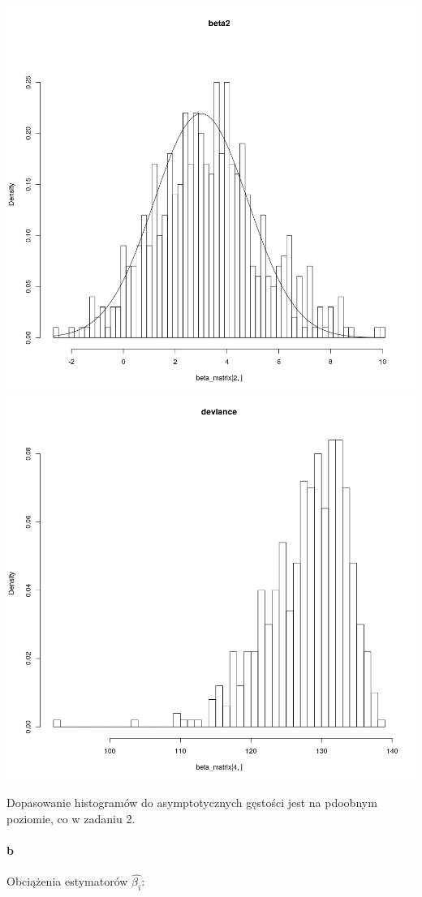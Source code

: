 \documentclass[a4paper,11pt]{article}
\begin{document}
\includegraphics[scale=.35]{beta2_3.png} 
\includegraphics[scale=.35]{deviance_3.png} 

Dopasowanie histogramów do asymptotycznych gęstości jest na pdoobnym poziomie, co w zadaniu 2. 

\paragraph{b} Obciążenia estymatorów $\widehat{\beta_{i}}$:
\end{document}
